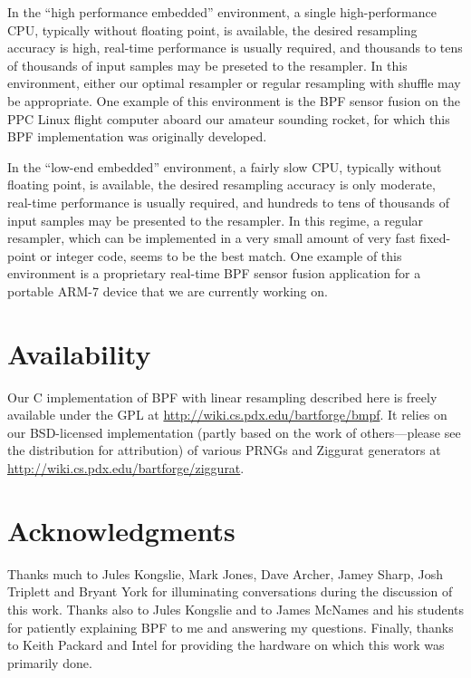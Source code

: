 \documentclass[12pt]{article}
\begin{document}
  In the ``high performance embedded'' environment, a single
  high-performance CPU, typically without floating point, is
  available, the desired resampling accuracy is high,
  real-time performance is usually required, and thousands
  to tens of thousands of input samples may be preseted to
  the resampler.  In this environment, either our optimal
  resampler or regular resampling with shuffle may be
  appropriate.  One example of this environment is the BPF
  sensor fusion on the PPC Linux flight computer aboard our
  amateur sounding rocket, for which this BPF implementation
  was originally developed.

  In the ``low-end embedded'' environment, a fairly slow
  CPU, typically without floating point, is available, the
  desired resampling accuracy is only moderate, real-time
  performance is usually required, and hundreds to tens of
  thousands of input samples may be presented to the
  resampler.  In this regime, a regular resampler, which
  can be implemented in a very small amount of very fast
  fixed-point or integer code, seems to be the best match.
  One example of this environment is a proprietary real-time
  BPF sensor fusion application for a portable ARM-7 device
  that we are currently working on.

\section*{Availability}

  Our C implementation of BPF with linear resampling
  described here is freely available under the GPL at
  \url{http://wiki.cs.pdx.edu/bartforge/bmpf}.  It relies on
  our BSD-licensed implementation (partly based on the work
  of others---please see the distribution for attribution)
  of various PRNGs and Ziggurat generators at
  \url{http://wiki.cs.pdx.edu/bartforge/ziggurat}.

\section*{Acknowledgments}

  Thanks much to Jules Kongslie, Mark Jones, Dave Archer,
  Jamey Sharp, Josh Triplett and Bryant York for
  illuminating conversations during the discussion of this
  work.  Thanks also to Jules Kongslie and to James McNames
  and his students for patiently explaining BPF to me and
  answering my questions.  Finally, thanks to Keith Packard
  and Intel for providing the hardware on which this work
  was primarily done.



\end{document}
